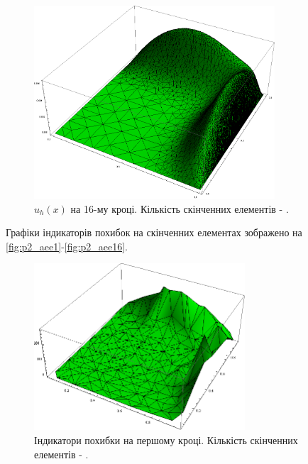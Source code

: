 \begin{figure}[H]
	\centering
    \includegraphics[width=0.8\textwidth]{problem2/my/solutions/solution16}
    \caption{$u_h(x)$ на 16-му кроці. Кількість скінченних елементів - .}
    \label{fig:p2_solution16}
\end{figure}

\clearpage
Графіки індикаторів похибок на скінченних елементах зображено на \autoref{fig:p2_aee1}-\ref{fig:p2_aee16}.

\begin{figure}[H]
	\centering
    \includegraphics[width=0.7\textwidth]{problem2/my/AEE/aee1}
    \caption{Індикатори похибки на першому кроці. Кількість скінченних елементів - .}
    \label{fig:p2_aee1}
\end{figure}


